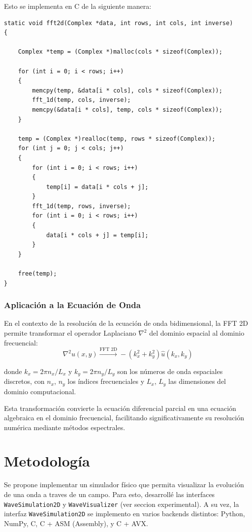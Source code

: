 \documentclass[a4paper]{article}
\begin{document}
Esto se implementa en C de la siguiente manera:
\begin{verbatim}
static void fft2d(Complex *data, int rows, int cols, int inverse)
{

    Complex *temp = (Complex *)malloc(cols * sizeof(Complex));

    for (int i = 0; i < rows; i++)
    {
        memcpy(temp, &data[i * cols], cols * sizeof(Complex));
        fft_1d(temp, cols, inverse);
        memcpy(&data[i * cols], temp, cols * sizeof(Complex));
    }

    temp = (Complex *)realloc(temp, rows * sizeof(Complex));
    for (int j = 0; j < cols; j++)
    {
        for (int i = 0; i < rows; i++)
        {
            temp[i] = data[i * cols + j];
        }
        fft_1d(temp, rows, inverse);
        for (int i = 0; i < rows; i++)
        {
            data[i * cols + j] = temp[i];
        }
    }

    free(temp);
}
\end{verbatim}

\subsubsection{Aplicación a la Ecuación de Onda}

En el contexto de la resolución de la ecuación de onda bidimensional, la FFT 2D permite transformar el operador Laplaciano $\nabla^2$ del dominio espacial al dominio frecuencial:
\begin{equation}
    \nabla^2 u(x,y) \xrightarrow{\text{FFT 2D}} -(k_x^2 + k_y^2) \hat{u}(k_x, k_y)
\end{equation}

donde $k_x = 2\pi n_x/L_x$ y $k_y = 2\pi n_y/L_y$ son los números de onda espaciales discretos, con $n_x$, $n_y$ los índices frecuenciales y $L_x$, $L_y$ las dimensiones del dominio computacional.

Esta transformación convierte la ecuación diferencial parcial en una ecuación algebraica en el dominio frecuencial, facilitando
significativamente su resolución numérica mediante métodos espectrales.

\section{Metodología}
Se propone implementar un simulador físico que permita visualizar la evolución de una onda a traves de un campo. Para esto, desarrollé
las interfaces \texttt{WaveSimulation2D} y \texttt{WaveVisualizer} (ver seccion experimental). A su vez, la interfaz \texttt{WaveSimulation2D} se implemento en varios
backends distintos: Python, NumPy, C, C + ASM (Assembly), y C + AVX.
\end{document}

